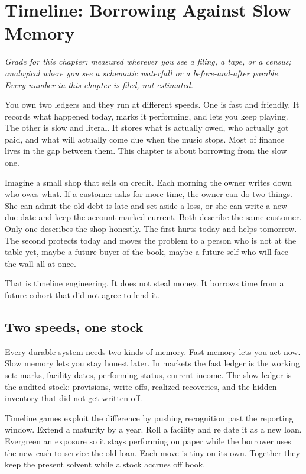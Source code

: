 \chapter{Timeline: Borrowing Against Slow Memory}
\label{ch:timeline}

\textit{Grade for this chapter: measured wherever you see a filing, a tape, or a census; analogical where you see a schematic waterfall or a before-and-after parable. Every number in this chapter is filed, not estimated.}

You own two ledgers and they run at different speeds. One is fast and friendly. It records what happened today, marks it performing, and lets you keep playing. The other is slow and literal. It stores what is actually owed, who actually got paid, and what will actually come due when the music stops. Most of finance lives in the gap between them. This chapter is about borrowing from the slow one.

Imagine a small shop that sells on credit. Each morning the owner writes down who owes what. If a customer asks for more time, the owner can do two things. She can admit the old debt is late and set aside a loss, or she can write a new due date and keep the account marked current. Both describe the same customer. Only one describes the shop honestly. The first hurts today and helps tomorrow. The second protects today and moves the problem to a person who is not at the table yet, maybe a future buyer of the book, maybe a future self who will face the wall all at once.

That is timeline engineering. It does not steal money. It borrows time from a future cohort that did not agree to lend it.

\section{Two speeds, one stock}

Every durable system needs two kinds of memory. Fast memory lets you act now. Slow memory lets you stay honest later. In markets the fast ledger is the working set: marks, facility dates, performing status, current income. The slow ledger is the audited stock: provisions, write offs, realized recoveries, and the hidden inventory that did not get written off.

Timeline games exploit the difference by pushing recognition past the reporting window. Extend a maturity by a year. Roll a facility and re date it as a new loan. Evergreen an exposure so it stays performing on paper while the borrower uses the new cash to service the old loan. Each move is tiny on its own. Together they keep the present solvent while a stock accrues off book.

